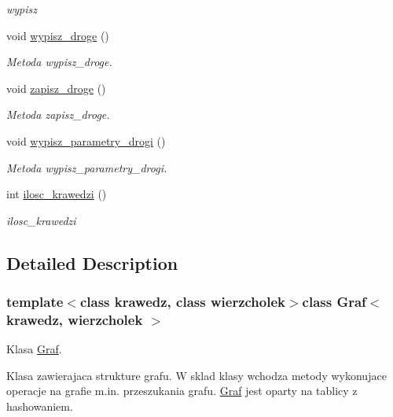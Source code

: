 \begin{DoxyCompactItemize}
\begin{DoxyCompactList}\small\item\em wypisz \end{DoxyCompactList}\item 
void \hyperlink{class_graf_a9fd6c0adb4a4a68db7ee40e405ec3e79}{wypisz\+\_\+droge} ()
\begin{DoxyCompactList}\small\item\em Metoda wypisz\+\_\+droge. \end{DoxyCompactList}\item 
void \hyperlink{class_graf_a55630a8b15160e3ab3ceaa67638f051b}{zapisz\+\_\+droge} ()
\begin{DoxyCompactList}\small\item\em Metoda zapisz\+\_\+droge. \end{DoxyCompactList}\item 
void \hyperlink{class_graf_a44233c13244681f1c75a7f20f1241feb}{wypisz\+\_\+parametry\+\_\+drogi} ()
\begin{DoxyCompactList}\small\item\em Metoda wypisz\+\_\+parametry\+\_\+drogi. \end{DoxyCompactList}\item 
int \hyperlink{class_graf_ade1cb15f2ea58de66f3d93d1677d8103}{ilosc\+\_\+krawedzi} ()
\begin{DoxyCompactList}\small\item\em ilosc\+\_\+krawedzi \end{DoxyCompactList}\end{DoxyCompactItemize}


\subsection{Detailed Description}
\subsubsection*{template$<$class krawedz, class wierzcholek$>$class Graf$<$ krawedz, wierzcholek $>$}

Klasa \hyperlink{class_graf}{Graf}. 

Klasa zawierajaca strukture grafu. W sklad klasy wchodza metody wykonujace operacje na grafie m.\+in. przeszukania grafu. \hyperlink{class_graf}{Graf} jest oparty na tablicy z hashowaniem. 

